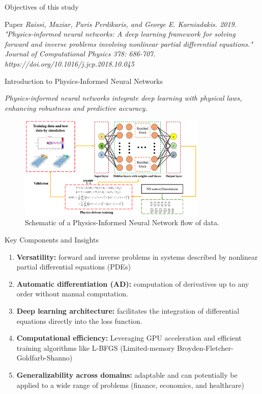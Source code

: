 \begin{frame}{Objectives of this study}
\begin{block}{Paper}
        \emph{Raissi, Maziar, Paris Perdikaris, and George E. Karniadakis. 2019. "Physics-informed neural networks: A deep learning framework for solving forward and inverse problems involving nonlinear partial differential equations." Journal of Computational Physics 378: 686-707. https://doi.org/10.1016/j.jcp.2018.10.045}
    \end{block}
\end{frame}

\begin{frame}{Introduction to Physics-Informed Neural Networks}
\begin{block}{}
        \emph{Physics-informed neural networks integrate deep learning with physical laws, enhancing robustness and predictive accuracy.}
    \end{block}
\begin{figure}[H]
    \centering
    \includegraphics[width=0.8\textwidth]{img/pnn1.png}
    \caption{Schematic of a Physics-Informed Neural Network flow of data.}
    \label{fig:Physics-Informed Neural Networks}
\end{figure} 
\end{frame}

\begin{frame}{Key Components and Insights}
\begin{enumerate}
    \item \textbf{Versatility:} forward and inverse problems in systems described by nonlinear partial differential equations (PDEs)
    \item \textbf{Automatic differentiation (AD):} computation of derivatives up to any order without manual computation. 
    \item \textbf{Deep learning architecture:} facilitates the integration of differential equations directly into the loss function.
    \item \textbf{Computational efficiency:} Leveraging GPU acceleration and efficient training algorithms like L-BFGS (Limited-memory Broyden-Fletcher-Goldfarb-Shanno)
    \item \textbf{Generalizability across domains:} adaptable and can potentially be applied to a wide range of problems (finance, economics, and healthcare)
\end{enumerate}
\end{frame}


